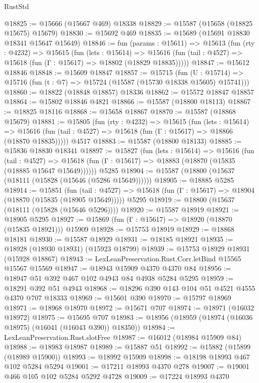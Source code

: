 \begin{lexlean}{RustStd}
\begin{coremodule}
@18825 := @15666 (@15667 @469) @18338
@18829 := @15587 (@15658 (@18825 @15675) @15679)
@18830 := @15692 @469
@18835 := @15689 (@15691 @18830 @18341 @15647 @15649)
@18846 := fun (params : @15611) =>
  @15613
    (fun (rty : @4232) =>
    @15615
      (fun (lets : @15614) =>
      @15616 (fun (tail : @4527) => @15618 (fun (Γ : @15617) => @18802 (@18829 @18835)))))
@18847 := @15612 @18846
@18848 := @15609 @18847
@18857 := @15715
    (fun (U : @15714) => @15716 (fun (t : @7) => @15724 (@15587 (@15730 @18338 @15605) @15741)))
@18860 := @18822 (@18848 @18857) @18336
@18862 := @15572 @18847 @18857
@18864 := @15802 @18846 @4821
@18866 := @15587 (@18800 @18113)
@18867 := @18825 @18116
@18868 := @15658 @18867
@18870 := @15587 (@18868 @15679)
@18881 := @15805
    (fun (rty : @4232) =>
    @15615
      (fun (lets : @15614) =>
      @15616 (fun (tail : @4527) => @15618 (fun (Γ : @15617) => @18866 (@18870 @18835)))))
    @4517
@18883 := @15587 (@18800 @18133)
@18885 := @15836 @18830 @18341
@18897 := @15827
    (fun (lets : @15614) =>
    @15616
      (fun (tail : @4527) =>
      @15618 (fun (Γ : @15617) => @18883 (@18870 (@15835 (@18885 @15647 @15649))))))
    @5285
@18904 := @15587 (@18800 (@15637 (@18111 (@15828 (@15646 (@5286 @15649))))))
@18905 := @18885 @5285
@18914 := @15851
    (fun (tail : @4527) => @15618 (fun (Γ : @15617) => @18904 (@18870 (@15835 (@18905 @15649)))))
    @5295
@18919 := @18800 (@15637 (@18111 (@15828 (@15646 @5296))))
@18920 := @15587 @18919
@18921 := @18905 @5295
@18927 := @15869 (fun (Γ : @15617) => @18920 (@18870 (@15835 @18921))) @15909
@18928 := @15753 @18919
@18929 := @18868 @18181
@18930 := @15587 @18929
@18931 := @18185 @18921
@18935 := @18928 (@18930 @18931) (@15923 @18799)
@18939 := @15753 @18929 @18931 (@15928 @18867)
@18943 := LexLeanPreservation.Rust.Corr.letBind @15565 @15567 @15569
@18947 := @18943 @15909 @4370 @4370 @84
@18956 := @18947 @51 @392 @467 @102 @4943 @84 @4938 @5284 @5295
@18959 := @18291 @392 @51 @4943
@18968 := @18296 @390 @143 @104 @51 @4521 @4555 @4370 @707 @18333
@18969 := @15601 @390
@18970 := @15797 @18969
@18971 := @18968 @18970
@18972 := @15671 @707
@18974 := @18971 (@16032 @18972)
@18975 := @15695 @707
@18983 := @18956 (@18959 (@18974 (@16036 @18975) (@16041 (@16043 @390)) @18350))
@18984 := LexLeanPreservation.Rust.slotFree
@18987 := @16012 (@18984 @15909 @84)
@18988 := @18983 @18987
@18989 := @15887 @51
@18992 := @15882 (@15899 (@18989 @15900))
@18993 := @18992 @15909
@18998 := @18198 @18993 @467 @102 @5284 @5294
@19001 := @17211 @18993 @4370 @278
@19007 := @19001 @466 @105 @102 @5284 @5292 @4728
@19009 := @17224 @18993 @4370

\end{coremodule}
\end{lexlean}

